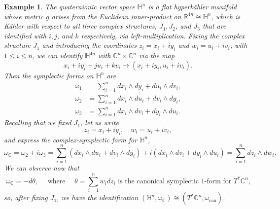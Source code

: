 \documentclass{amsart}
\newtheorem{example}{Example}
\newcommand{\w}{\omega}
\newcommand{\RR}{\mathbb{R}}
\newcommand{\CC}{\mathbb{C}}
\newcommand{\HH}{\mathbb{H}}
\begin{document}
	\begin{example}
		The quaternionic vector space $\HH^{n}$ is a flat hyperk\"ahler manifold whose metric $g$ arises from the Euclidean inner-product on $\RR^{4n}\cong \HH^{n}$, which is K\"ahler with respect to all three complex structures, $J_{1}, J_{2}$, and $J_{3}$ that are identified with $i, j$, and $k$ respectively, via left-multiplication. Fixing the complex structure $J_{1}$ and introducing the coordinates $z_{i} = x_{i} + i y_{i}$ and $w_{i} = u_{i} + i v_{i}$, with $1 \leq i \leq n$, we can identify $\HH^{4n}$ with $\CC^{n} \times \CC^{n}$ via the map
		\[
		x_{i} + iy_{i} + ju_{i} + kv_{i} \mapsto (x_{i} + iy_{i}, u_{i} + iv_{i}).
		\]
		Then the symplectic forms on $\HH^{n}$ are
		\begin{equation*}
			\begin{split}
				\w_{1} &= \sum_{i=1}^{n} dx_{i} \wedge dy_{i} + du_{i} \wedge dv_{i}, \\
				\w_{2} &= \sum_{i=1}^{n} dx_{i} \wedge du_{i} + dv_{i} \wedge dy_{i}, \\
				\w_{3} &= \sum_{i=1}^{n} dx_{i} \wedge dv_{i} + dy_{i} \wedge du_{i}.
			\end{split}
		\end{equation*}
		Recalling that we fixed $J_{1}$, let us write
		\[
		z_{i} = x_{i} + iy_{i}, \quad w_{i} = u_{i} + iv_{i},
		\]
		and express the complex-symplectic form for $\HH^{n}$,
		\[
		\w_{\CC} = \w_{2} + i\w_{3} = \sum_{i=1}^{n} \left( dx_{i} \wedge du_{i} + dv_{i} \wedge dy_{i} \right) + i \left( dx_{i} \wedge dv_{i} + dy_{i} \wedge du_{i} \right) = \sum_{i=1}^{n} dz_{i} \wedge dw_{i}.
		\]
		We can observe now that
		\[
		\w_{\CC} = -d\theta, \quad \text{ where } \quad \theta = \sum_{i=1}^{n} w_{i}dz_{i} \text{ is the canonical symplectic $1$-form for $T^{\ast}\CC^{n}$,}
		\]
		so, after fixing $J_{1}$, we have the identification $(\HH^{n}, \w_{\CC}) \cong (T^{\ast}\CC^{n}, \w_{\text{can}})$.
	\end{example}
	
\end{document}
